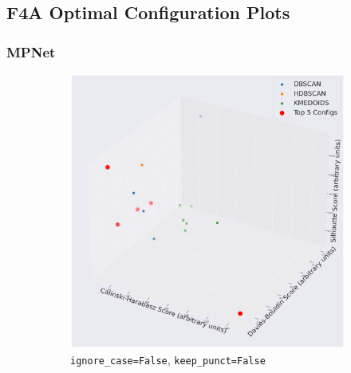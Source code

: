 \documentclass[10pt,oneside]{report}
\begin{document}
\subsection{F4A Optimal Configuration Plots}\label{sec:f4a_config_appendix} %

\subsubsection{MPNet}

\begin{figure}[H]
    \centering
    \begin{subfigure}[b]{0.48\textwidth}
        \centering
        \includegraphics[width=\textwidth]{./images/mpnet_false-false.png}
        \caption{\texttt{ignore\_case=False}, \texttt{keep\_punct=False}}
        \label{fig:mpnet_ff_f4a_config} %
    \end{subfigure}
    \hfill
    \begin{subfigure}[b]{0.48\textwidth}
        \centering

\end{subfigure}
\end{figure}
\end{document}
